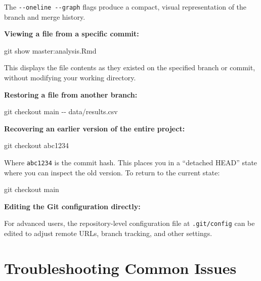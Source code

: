 \documentclass[
  letterpaper,
  DIV=11,
  numbers=noendperiod]{scrartcl}
\newenvironment{Shaded}{\begin{snugshade}}{\end{snugshade}}
\newcommand{\AttributeTok}[1]{\textcolor[rgb]{0.40,0.45,0.13}{#1}}
\newcommand{\FunctionTok}[1]{\textcolor[rgb]{0.28,0.35,0.67}{#1}}
\newcommand{\NormalTok}[1]{\textcolor[rgb]{0.00,0.23,0.31}{#1}}
\begin{document}
The \texttt{-\/-oneline\ -\/-graph} flags produce a compact, visual
representation of the branch and merge history.

\textbf{Viewing a file from a specific commit:}

\begin{Shaded}
\begin{Highlighting}[]
\FunctionTok{git}\NormalTok{ show master:analysis.Rmd}
\end{Highlighting}
\end{Shaded}

This displays the file contents as they existed on the specified branch
or commit, without modifying your working directory.

\textbf{Restoring a file from another branch:}

\begin{Shaded}
\begin{Highlighting}[]
\FunctionTok{git}\NormalTok{ checkout main }\AttributeTok{{-}{-}}\NormalTok{ data/results.csv}
\end{Highlighting}
\end{Shaded}

\textbf{Recovering an earlier version of the entire project:}

\begin{Shaded}
\begin{Highlighting}[]
\FunctionTok{git}\NormalTok{ checkout abc1234}
\end{Highlighting}
\end{Shaded}

Where \texttt{abc1234} is the commit hash. This places you in a
``detached HEAD'' state where you can inspect the old version. To return
to the current state:

\begin{Shaded}
\begin{Highlighting}[]
\FunctionTok{git}\NormalTok{ checkout main}
\end{Highlighting}
\end{Shaded}

\textbf{Editing the Git configuration directly:}

For advanced users, the repository-level configuration file at
\texttt{.git/config} can be edited to adjust remote URLs, branch
tracking, and other settings.

\section{Troubleshooting Common
Issues}\label{troubleshooting-common-issues}
\end{document}
